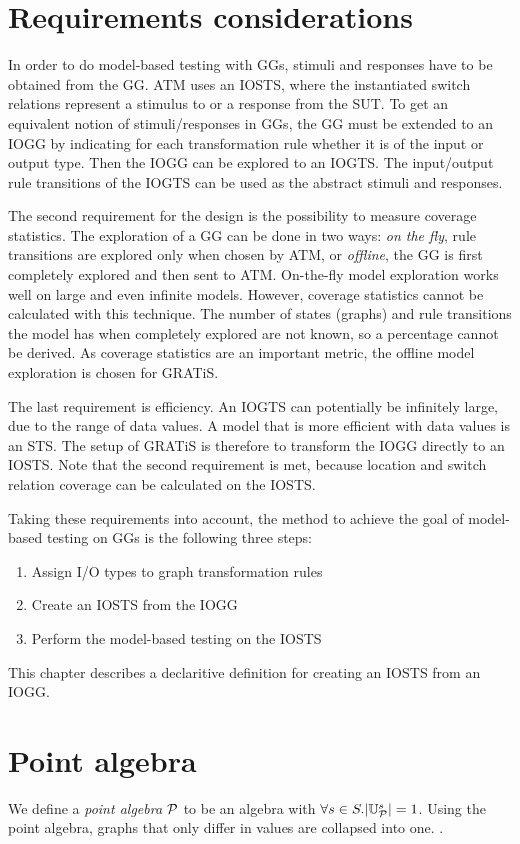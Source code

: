 \section{Requirements considerations}
In order to do model-based testing with GGs, stimuli and responses have to be obtained from the GG. ATM uses an IOSTS, where the instantiated switch relations represent a stimulus to or a response from the SUT. To get an equivalent notion of stimuli/responses in GGs, the GG must be extended to an IOGG by indicating for each transformation rule whether it is of the input or output type. Then the IOGG can be explored to an IOGTS. The input/output rule transitions of the IOGTS can be used as the abstract stimuli and responses.

The second requirement for the design is the possibility to measure coverage statistics. The exploration of a GG can be done in two ways: \textit{on the fly}, rule transitions are explored only when chosen by ATM, or \textit{offline}, the GG is first completely explored and then sent to ATM. On-the-fly model exploration works well on large and even infinite models. However, coverage statistics cannot be calculated with this technique. The number of states (graphs) and rule transitions the model has when completely explored are not known, so a percentage cannot be derived. As coverage statistics are an important metric, the offline model exploration is chosen for GRATiS.

The last requirement is efficiency. An IOGTS can potentially be infinitely large, due to the range of data values. A model that is more efficient with data values is an STS. The setup of GRATiS is therefore to transform the IOGG directly to an IOSTS. Note that the second requirement is met, because location and switch relation coverage can be calculated on the IOSTS.

Taking these requirements into account, the method to achieve the goal of model-based testing on GGs is the following three steps:
\begin{enumerate}
\item Assign I/O types to graph transformation rules
\item Create an IOSTS from the IOGG
\item Perform the model-based testing on the IOSTS
\end{enumerate}
This chapter describes a declaritive definition for creating an IOSTS from an IOGG.

\section{Point algebra}
We define a \textit{point algebra} $\mathcal{P}$ to be an algebra with $\forall s \in S . |\mathbb{U}_{\mathcal{P}}^s| = 1$.  Using the point algebra, graphs that only differ in values are collapsed into one. .


